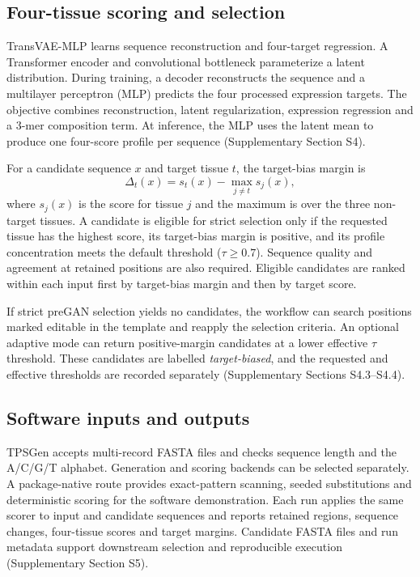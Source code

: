 \documentclass[namedate,webpdf,modern,large]{oup-authoring-template}
\begin{document}
\subsection{Four-tissue scoring and selection}

TransVAE-MLP learns sequence reconstruction and four-target regression. A Transformer encoder and convolutional bottleneck parameterize a latent distribution. During training, a decoder reconstructs the sequence and a multilayer perceptron (MLP) predicts the four processed expression targets. The objective combines reconstruction, latent regularization, expression regression and a 3-mer composition term. At inference, the MLP uses the latent mean to produce one four-score profile per sequence (Supplementary Section S4).

For a candidate sequence $x$ and target tissue $t$, the target-bias margin is
\begin{equation}
\Delta_t(x)=s_t(x)-\max_{j\ne t}s_j(x),
\label{eq:target-bias}
\end{equation}
where $s_j(x)$ is the score for tissue $j$ and the maximum is over the
three non-target tissues. A candidate is eligible for strict selection
only if the requested tissue has the highest score, its target-bias
margin is positive, and its profile concentration meets the default
threshold ($\tau\geq0.7$). Sequence quality and agreement at retained
positions are also required. Eligible candidates are ranked within each
input first by target-bias margin and then by target score.

If strict preGAN selection yields no candidates, the workflow can search positions marked editable in the template and reapply the selection criteria. An optional adaptive mode can return positive-margin candidates at a lower effective $\tau$ threshold. These candidates are labelled \emph{target-biased}, and the requested and effective thresholds are recorded separately (Supplementary Sections S4.3--S4.4).

\subsection{Software inputs and outputs}

TPSGen accepts multi-record FASTA files and checks sequence length and the A/C/G/T alphabet. Generation and scoring backends can be selected separately. A package-native route provides exact-pattern scanning, seeded substitutions and deterministic scoring for the software demonstration. Each run applies the same scorer to input and candidate sequences and reports retained regions, sequence changes, four-tissue scores and target margins. Candidate FASTA files and run metadata support downstream selection and reproducible execution (Supplementary Section S5).
\end{document}
